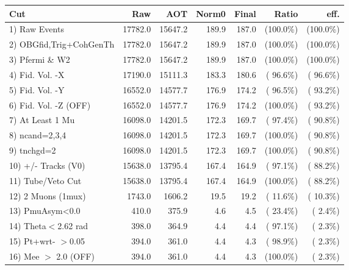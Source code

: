  \begin{table}[h!]\centering
 \begin{tabular}{||l||r|r|r|r|r|r||}
 \hline
 \hline
 Cut & Raw & AOT & Norm0 & Final & Ratio & eff.       \\
 \hline
  1) Raw Events           &      17782.0 &      15647.2 &        189.9 &        187.0 & (100.0\%) & (100.0\%) \\
  2) OBGfid,Trig+CohGenTh &      17782.0 &      15647.2 &        189.9 &        187.0 & (100.0\%) & (100.0\%) \\
  3) Pfermi \& W2         &      17782.0 &      15647.2 &        189.9 &        187.0 & (100.0\%) & (100.0\%) \\
  4) Fid. Vol. -X         &      17190.0 &      15111.3 &        183.3 &        180.6 & ( 96.6\%) & ( 96.6\%) \\
  5) Fid. Vol. -Y         &      16552.0 &      14577.7 &        176.9 &        174.2 & ( 96.5\%) & ( 93.2\%) \\
  6) Fid. Vol. -Z (OFF)   &      16552.0 &      14577.7 &        176.9 &        174.2 & (100.0\%) & ( 93.2\%) \\
  7) At Least 1 Mu        &      16098.0 &      14201.5 &        172.3 &        169.7 & ( 97.4\%) & ( 90.8\%) \\
  8) ncand=2,3,4          &      16098.0 &      14201.5 &        172.3 &        169.7 & (100.0\%) & ( 90.8\%) \\
  9) tnchgd=2             &      16098.0 &      14201.5 &        172.3 &        169.7 & (100.0\%) & ( 90.8\%) \\
 10) +/- Tracks (V0)      &      15638.0 &      13795.4 &        167.4 &        164.9 & ( 97.1\%) & ( 88.2\%) \\
 11) Tube/Veto Cut        &      15638.0 &      13795.4 &        167.4 &        164.9 & (100.0\%) & ( 88.2\%) \\
 12) 2 Muons (1mux)       &       1743.0 &       1606.2 &         19.5 &         19.2 & ( 11.6\%) & ( 10.3\%) \\
 13) PmuAsym<0.0          &        410.0 &        375.9 &          4.6 &          4.5 & ( 23.4\%) & (  2.4\%) \\
 14) Theta$<$2.62 rad     &        398.0 &        364.9 &          4.4 &          4.4 & ( 97.1\%) & (  2.3\%) \\
 15) Pt+wrt- $>$0.05      &        394.0 &        361.0 &          4.4 &          4.3 & ( 98.9\%) & (  2.3\%) \\
 16) Mee $>$ 2.0  (OFF)   &        394.0 &        361.0 &          4.4 &          4.3 & (100.0\%) & (  2.3\%) \\

\end{tabular}
\end{table}
